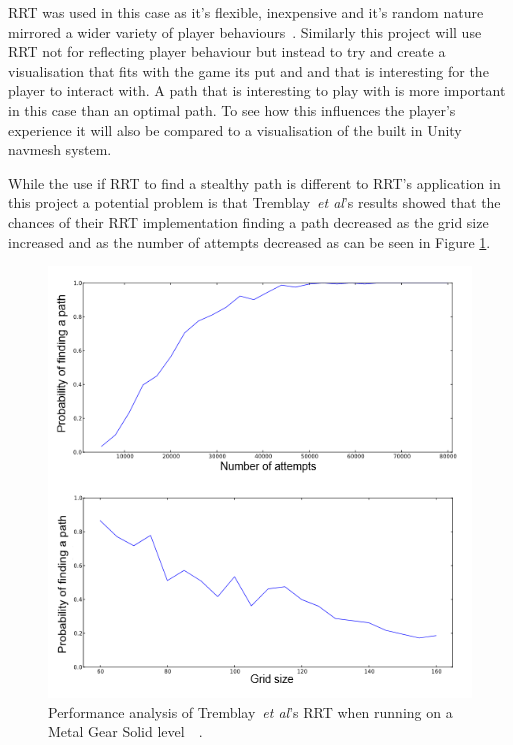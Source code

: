 \documentclass[journal]{IEEEtran}
\begin{document}
RRT was used in this case as it's flexible, inexpensive and it's random nature mirrored a wider variety of player behaviours~\cite{Tremblay2013}. Similarly this project will use RRT not for reflecting player behaviour but instead to try and create a visualisation that fits with the game its put and and that is interesting for the player to interact with. A path that is interesting to play with is more important in this case than an optimal path. To see how this influences the player's experience it will also be compared to a visualisation of the built in Unity navmesh system. 


While the use if RRT to find a stealthy path is different to RRT's application in this project a potential problem is that Tremblay~\textit{et al}'s results showed that the chances of their RRT implementation finding a path decreased as the grid size increased and as the number of attempts decreased as can be seen in Figure \ref{TremblayRRT}. 

\begin{figure}[h]
	\includegraphics[width=1.0\linewidth]{Tremblay2013.png}
	\caption{ Performance analysis of Tremblay~\textit{et al}'s RRT when running on a Metal Gear Solid level~\cite{Tremblay2013}~\cite{game:MetalGearSolid}.}
	\label{TremblayRRT}
\end{figure} 
\end{document}
